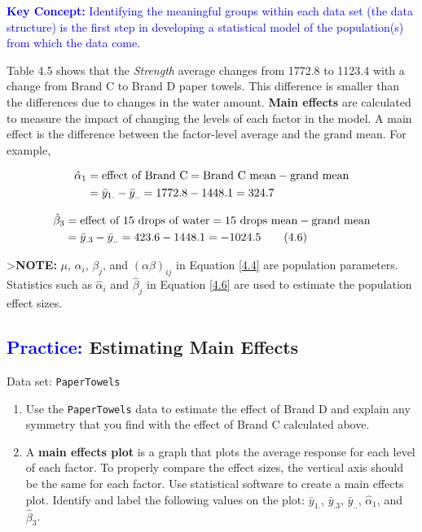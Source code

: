 \documentclass[
]{report}
\begin{document}
\textbf{\textcolor{blue}{Key Concept:}} \textcolor{blue}{Identifying the meaningful groups within each data set (the data structure) is the first step in developing a statistical model of the population(s) from which the data come.}

Table 4.5 shows that the \emph{Strength} average changes from 1772.8 to 1123.4 with a change from Brand C to Brand D paper towels. This difference is smaller than the differences due to changes in the water amount. \textbf{Main effects} are calculated to measure the impact of changing the levels of each factor in the model. A main effect is the difference between the factor-level average and the grand mean. For example,

\begin{align}
\hat{\alpha}_1 &= \text{effect of Brand C} = \text{Brand C mean} - \text{grand mean} \notag \\
&= \bar{y}_{1.} - \bar{y}_{..} = 1772.8 - 1448.1 = 324.7 \notag
\end{align}

\begin{align}\label{4.6}
\hat{\beta}_3 &= \text{effect of 15 drops of water} = \text{15 drops mean} - \text{grand mean} \notag \\
&= \bar{y}_{.3} - \bar{y}_{..} = 423.6 - 1448.1 = -1024.5 \tag{4.6}
\end{align}

\textgreater{}\textbf{NOTE:} \(\scriptstyle \mu\), \(\scriptstyle \alpha_i\), \(\scriptstyle \beta_j\), and \(\scriptstyle (\alpha\beta)_{ij}\) in Equation \ref{4.4} are population parameters. Statistics such as \(\scriptstyle \hat{\alpha}_i\) and \(\scriptstyle \hat{\beta}_j\) in Equation \ref{4.6} are used to estimate the population effect sizes.

\hypertarget{estimating-main-effects}{%
\subsection*{\texorpdfstring{\textcolor{blue}{Practice:} Estimating Main Effects}{ Estimating Main Effects}}\label{estimating-main-effects}}

Data set: \texttt{PaperTowels}

\begin{enumerate}
\def\labelenumi{\arabic{enumi}.}
\setcounter{enumi}{23}
\item
  Use the \texttt{PaperTowels} data to estimate the effect of Brand D and explain any symmetry that you find with the effect of Brand C calculated above.
\item
  A \textbf{main effects plot} is a graph that plots the average response for each level of each factor. To properly compare the effect sizes, the vertical axis should be the same for each factor. Use statistical software to create a main effects plot. Identify and label the following values on the plot: \(\scriptstyle \bar{y}_{1.}\), \(\scriptstyle \bar{y}_{.3}\), \(\scriptstyle \bar{y}_{..}\), \(\scriptstyle \hat{\alpha}_1\), and \(\scriptstyle \hat{\beta}_3\).
\end{enumerate}
\end{document}
